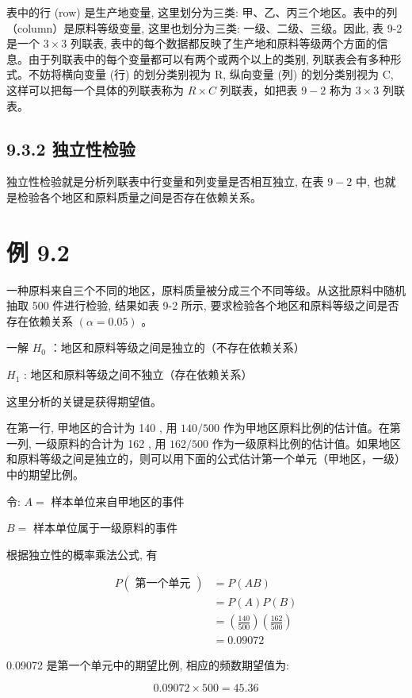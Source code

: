 \documentclass[10pt]{article}
\begin{document}
\begin{CJK*}{UTF8}{bsmi}
表中的行 (row) 是生产地变量, 这里划分为三类: 甲、乙、丙三个地区。表中的列 （column）是原料等级变量, 这里也划分为三类: 一级、二级、三级。因此, 表 9-2 是一个 $3 \times 3$ 列联表, 表中的每个数据都反映了生产地和原料等级两个方面的信息。由于列联表中的每个变量都可以有两个或两个以上的类别, 列联表会有多种形式。不妨将横向变量 (行) 的划分类别视为 $\mathrm{R}$, 纵向变量 (列) 的划分类别视为 $\mathrm{C}$, 这样可以把每一个具体的列联表称为 $R \times C$ 列联表，如把表 $9-2$ 称为 $3 \times 3$ 列联表。

\subsection*{9.3.2 独立性检验}
独立性检验就是分析列联表中行变量和列变量是否相互独立, 在表 $9-2$ 中, 也就是检验各个地区和原料质量之间是否存在依赖关系。

\section*{例 9.2}
一种原料来自三个不同的地区，原料质量被分成三个不同等级。从这批原料中随机抽取 500 件进行检验, 结果如表 9-2 所示, 要求检验各个地区和原料等级之间是否存在依赖关系 $(\alpha=0.05)$ 。

一解 $H_{0}$ ：地区和原料等级之间是独立的（不存在依赖关系）

$H_{1}$ : 地区和原料等级之间不独立（存在依赖关系）

这里分析的关键是获得期望值。

在第一行, 甲地区的合计为 140 , 用 $140 / 500$ 作为甲地区原料比例的估计值。在第一列, 一级原料的合计为 162 , 用 $162 / 500$ 作为一级原料比例的估计值。如果地区和原料等级之间是独立的，则可以用下面的公式估计第一个单元（甲地区，一级）中的期望比例。

令: $A=$ 样本单位来自甲地区的事件

$B=$ 样本单位属于一级原料的事件

根据独立性的概率乘法公式, 有

$$
\begin{aligned}
P(\text { 第一个单元 }) & =P(A B) \\
& =P(A) P(B) \\
& =\left(\frac{140}{500}\right)\left(\frac{162}{500}\right) \\
& =0.09072
\end{aligned}
$$

0.09072 是第一个单元中的期望比例, 相应的频数期望值为:

$$
0.09072 \times 500=45.36
$$


\end{CJK*}
\end{document}

